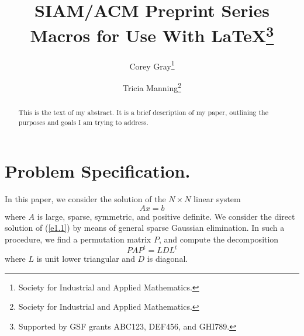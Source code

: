 \documentclass[twoside,leqno,twocolumn]{article}
\begin{document}

\title{\Large SIAM/ACM Preprint Series Macros for
Use With LaTeX\thanks{Supported by GSF grants ABC123, DEF456, and GHI789.}}
\author{Corey Gray\thanks{Society for Industrial and Applied Mathematics.}
\and Tricia Manning\thanks{Society for Industrial and Applied Mathematics.}}

\date{}

\maketitle







\begin{abstract} \small\baselineskip=9pt This is the text of my abstract. It is a brief
description of my
paper, outlining the purposes and goals I am trying to address.\end{abstract}




\section{Problem Specification.}In this paper, we consider the solution of the $N \times
N$ linear
system
\begin{equation} \label{e1.1}
A x = b
\end{equation}
where $A$ is large, sparse, symmetric, and positive definite.  We consider
the direct solution of (\ref{e1.1}) by means of general sparse Gaussian
elimination.  In such a procedure, we find a permutation matrix $P$, and
compute the decomposition
\[
P A P^{t} = L D L^{t}
\]
where $L$ is unit lower triangular and $D$ is diagonal.
\end{document}
